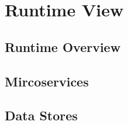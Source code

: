 \section{Runtime View}
\subsection{Runtime Overview}
\subsection{Mircoservices}
\subsection{Data Stores}